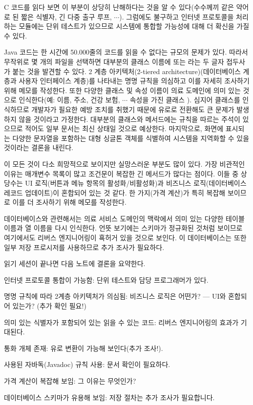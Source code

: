 \documentclass[a4paper,10pt,twoside]{book}
\begin{document}
C 코드를 읽다 보면 이 부분이 상당히 난해하다는 것을 알 수 있다(수수께끼 같은 약어로 된 짧은 식별자, 긴 다중 출구 루프, $\cdots$). 그럼에도 불구하고 인터넷 프로토콜을 처리하는 모듈에는 단위 테스트가 있으므로 시스템에 통합할 가능성에 대해 더 확신을 가질 수 있다.

Java 코드는 한 시간에 50.000줄의 코드를 읽을 수 없다는 규모의 문제가 있다. 따라서 무작위로 몇 개의 파일을 선택하면 대부분의 클래스 이름에  또는 라는 두 글자 접두사가 붙는 것을 발견할 수 있다. 2 계층 아키텍처(2-tiered architecture)(데이터베이스 계층과 사용자 인터페이스 계층)를 나타내는 명명 규칙을 의심하고 이를 자세히 조사하기 위해 메모를 작성한다. 또한 다양한 클래스 및 속성 이름이 의료 도메인에 의미 있는 것으로 인식한다(예: 이름, 주소, 건강 보험, $\cdots$ 속성을 가진 클래스 ). 심지어  클래스를 인식하므로 개발자가 필요한 예방 조치를 취했기 때문에 유로로 전환해도 큰 문제가 발생하지 않을 것이라고 가정한다. 대부분의 클래스와 메서드에는  규칙을 따르는 주석이 있으므로 적어도 일부 문서는 최신 상태일 것으로 예상한다. 마지막으로, 화면에 표시되는 다양한 문자열을 포함하는 대형 싱글톤 객체를 식별하여 시스템을 지역화할 수 있을 것이라는 결론을 내린다.

이 모든 것이 다소 희망적으로 보이지만 실망스러운 부분도 많이 있다. 가장 비관적인 이유는 매개변수 목록이 많고 조건문이 복잡한 긴 메서드가 많다는 점이다. 이들 중 상당수는 UI 로직(버튼과 메뉴 항목의 활성화/비활성화)과 비즈니스 로직(데이터베이스 레코드 업데이트)이 혼합되어 있는 것 같다. 한 가지(가격 계산)가 특히 복잡해 보이므로 이를 더 조사하기 위해 메모를 작성한다.

데이터베이스와 관련해서는 의료 서비스 도메인의 맥락에서 의미 있는 다양한 테이블 이름과 열 이름을 다시 인식한다. 언뜻 보기에는 스키마가 정규화된 것처럼 보이므로 여기에서도 리버스 엔지니어링이 횩허거 있을 것으로 보인다. 이 데이터베이스는 또한 일부 저장 프로시저를 사용하므로 추가 조사가 필요하다.

읽기 세션이 끝나면 다음 노트에 결론을 요약한다.

\begin{bulletlist}
  \item 인터넷 프로토콜 통합이 가능함: 단위 테스트와 담당 프로그래머가 있다.

  \item 명명 규칙에 따라 2계층 아키텍처가 의심됨: 비즈니스 로직은 어떤가? --- UI와 혼합되어 있는가? (추가 확인 필요!)

  \item 의미 있는 식별자가 포함되어 있는 읽을 수 있는 코드: 리버스 엔지니어링의 효과가 기대된다.

  \item 통화 개체 존재: 유로 변환이 가능해 보인다(추가 조사!).

  \item 사용된 자바독(Javadoc) 규칙 사용: 문서 확인이 필요하다.

  \item 가격 계산이 복잡해 보임: 그 이유는 무엇인가?

  \item 데이터베이스 스키마가 유용해 보임: 저장 절차는 추가 조사가 필요합니다.

\end{bulletlist}
\end{document}
